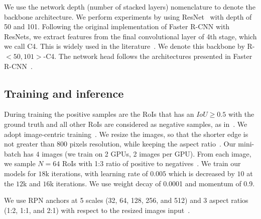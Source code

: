 We use the network depth (number of stacked layers) nomenclature to denote the backbone architecture.
We perform experiments by using ResNet~\cite{He2016deep}
with depth of 50 and 101.
Following the original implementation of Faster R-CNN with ResNets,
we extract features from the final convolutional layer of 4th stage, which we call C4.
This is widely used in the literature~\cite{He2016deep, Huang2017,Shrivastava2016skip}.
We denote this backbone by \mbox{R-$<50, 101>$-C4}.
%
The network head follows the architectures presented in Faster R-CNN~\cite{Ren2017fasterpami}.

\subsection{Training and inference}
%
During training the positive samples are the RoIs that has an $IoU \geq 0.5$ with the ground truth and all other RoIs are considered as negative samples, as in~\cite{Girshick2015}.
We adopt image-centric training~\cite{Girshick2015}.
We resize the images, so that the shorter edge is not greater than 800  pixels resolution, while keeping the aspect ratio~\cite{He2017mask}.
Our mini-batch has $4$ images (we train on 2 GPUs, 2 images per GPU).
From each image, we sample $N=64$ RoIs with 1:3 ratio of positive to negatives~\cite{Girshick2015, Ren2017fasterpami}.
We train our models for $18$k iterations, with learning rate of $0.005$ which is decreased by $10$ at the $12$k and $16$k iterations.
We use weight decay of 0.0001 and momentum of 0.9.

We use RPN anchors at 5 scales (32, 64, 128, 256, and 512) and 3 aspect ratios (1:2, 1:1, and 2:1) with respect to the resized images input~\cite{Lin2017pyramid}.

